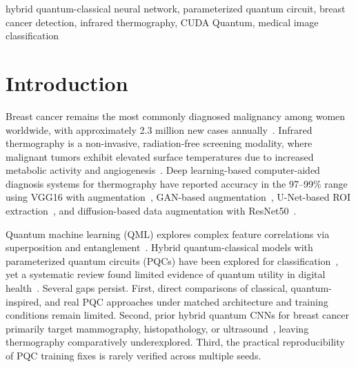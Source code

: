 \documentclass[conference]{IEEEtran}
\begin{document}
\begin{IEEEkeywords}
hybrid quantum-classical neural network, parameterized quantum circuit, breast cancer detection, infrared thermography, CUDA Quantum, medical image classification
\end{IEEEkeywords}

\section{Introduction}

Breast cancer remains the most commonly diagnosed malignancy among women worldwide, with approximately 2.3 million new cases annually~\cite{bray2024global}. Infrared thermography is a non-invasive, radiation-free screening modality, where malignant tumors exhibit elevated surface temperatures due to increased metabolic activity and angiogenesis~\cite{ng2009review, kennedy2009review}. Deep learning-based computer-aided diagnosis systems for thermography have reported accuracy in the 97--99\% range using VGG16 with augmentation~\cite{ahmed2023vgg16}, GAN-based augmentation~\cite{bcdgan2025}, U-Net-based ROI extraction~\cite{unet_breast2020}, and diffusion-based data augmentation with ResNet50~\cite{diffusion_thermo2024}.

Quantum machine learning (QML) explores complex feature correlations via superposition and entanglement~\cite{biamonte2017quantum, schuld2021machine}. Hybrid quantum-classical models with parameterized quantum circuits (PQCs) have been explored for classification~\cite{henderson2020quanvolutional, abbas2021power, wei2023quantum}, yet a systematic review found limited evidence of quantum utility in digital health~\cite{peral2024systematic}. Several gaps persist. First, direct comparisons of classical, quantum-inspired, and real PQC approaches under matched architecture and training conditions remain limited. Second, prior hybrid quantum CNNs for breast cancer primarily target mammography, histopathology, or ultrasound~\cite{xiang2024qccnn, quanvolutional_breast2024, ajlouni2023adaptive}, leaving thermography comparatively underexplored. Third, the practical reproducibility of PQC training fixes is rarely verified across multiple seeds.
\end{document}
